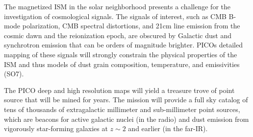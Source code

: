 \documentclass[PICOReport.tex]{subfiles}
\begin{document}
The magnetized ISM in the solar neighborhood presents a challenge for the investigation of cosmological signals. The signals of interest, such as CMB B-mode polarization, CMB spectral distortions, and 21cm line emission from the cosmic dawn and the reionization epoch, are obscured by Galactic dust and synchrotron emission that can be orders of magnitude brighter. PICOs detailed mapping of these signals will strongly constrain the physical properties of the ISM and thus models of dust grain composition, temperature, and emissivities (SO7). 

The PICO deep and high resolution maps will yield a treasure trove of point source that will be mined for years. The mission will provide a full sky catalog of tens of thousands of extragalactic millimeter and sub-millimeter point sources, which are beacons for active galactic nuclei (in the radio) and dust emission from vigorously star-forming galaxies at $z \sim 2$ and earlier (in the far-IR). 


\end{document}
